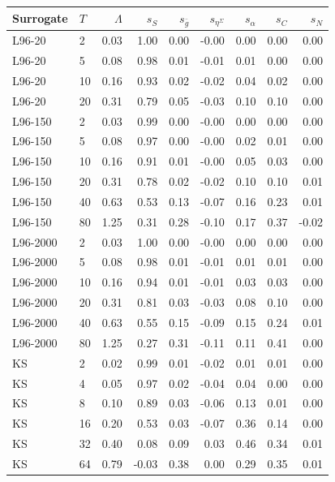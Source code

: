 \begin{tabular}{llrrrrrrr}
\toprule
Surrogate & $T$ & $\Lambda$ & $s_S$ & $s_{\bar g}$ & $s_{\eta^\Sigma}$ & $s_\alpha$ & $s_{C}$ & $s_N$\\
\midrule
L96-20 & 2 & 0.03 & 1.00 & 0.00 & -0.00 & 0.00 & 0.00 & 0.00\\
L96-20 & 5 & 0.08 & 0.98 & 0.01 & -0.01 & 0.01 & 0.00 & 0.00\\
L96-20 & 10 & 0.16 & 0.93 & 0.02 & -0.02 & 0.04 & 0.02 & 0.00\\
L96-20 & 20 & 0.31 & 0.79 & 0.05 & -0.03 & 0.10 & 0.10 & 0.00\\
\midrule
L96-150 & 2 & 0.03 & 0.99 & 0.00 & -0.00 & 0.00 & 0.00 & 0.00\\
L96-150 & 5 & 0.08 & 0.97 & 0.00 & -0.00 & 0.02 & 0.01 & 0.00\\
L96-150 & 10 & 0.16 & 0.91 & 0.01 & -0.00 & 0.05 & 0.03 & 0.00\\
L96-150 & 20 & 0.31 & 0.78 & 0.02 & -0.02 & 0.10 & 0.10 & 0.01\\
L96-150 & 40 & 0.63 & 0.53 & 0.13 & -0.07 & 0.16 & 0.23 & 0.01\\
L96-150 & 80 & 1.25 & 0.31 & 0.28 & -0.10 & 0.17 & 0.37 & -0.02\\
\midrule
L96-2000 & 2 & 0.03 & 1.00 & 0.00 & -0.00 & 0.00 & 0.00 & 0.00\\
L96-2000 & 5 & 0.08 & 0.98 & 0.01 & -0.01 & 0.01 & 0.01 & 0.00\\
L96-2000 & 10 & 0.16 & 0.94 & 0.01 & -0.01 & 0.03 & 0.03 & 0.00\\
L96-2000 & 20 & 0.31 & 0.81 & 0.03 & -0.03 & 0.08 & 0.10 & 0.00\\
L96-2000 & 40 & 0.63 & 0.55 & 0.15 & -0.09 & 0.15 & 0.24 & 0.01\\
L96-2000 & 80 & 1.25 & 0.27 & 0.31 & -0.11 & 0.11 & 0.41 & 0.00\\
\midrule
KS & 2 & 0.02 & 0.99 & 0.01 & -0.02 & 0.01 & 0.01 & 0.00\\
KS & 4 & 0.05 & 0.97 & 0.02 & -0.04 & 0.04 & 0.00 & 0.00\\
KS & 8 & 0.10 & 0.89 & 0.03 & -0.06 & 0.13 & 0.01 & 0.00\\
KS & 16 & 0.20 & 0.53 & 0.03 & -0.07 & 0.36 & 0.14 & 0.00\\
KS & 32 & 0.40 & 0.08 & 0.09 & 0.03 & 0.46 & 0.34 & 0.01\\
KS & 64 & 0.79 & -0.03 & 0.38 & 0.00 & 0.29 & 0.35 & 0.01\\
\bottomrule
\end{tabular}
